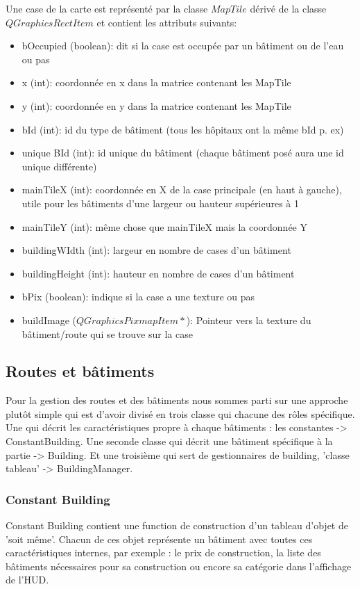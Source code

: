 \documentclass[a4paper,10pt,openany,oneside]{report}
\begin{document}
Une case de la carte est représenté par la classe $MapTile$ dérivé de la classe $QGraphicsRectItem$ et contient les attributs suivants:
\begin{itemize}
\item bOccupied (boolean): dit si la case est occupée par un bâtiment ou de l'eau ou pas
\item x (int): coordonnée en x dans la matrice contenant les MapTile
\item y (int): coordonnée en y dans la matrice contenant les MapTile
\item bId (int): id du type de bâtiment (tous les hôpitaux ont la même bId p. ex)
\item unique BId (int): id unique du bâtiment (chaque bâtiment posé aura une id unique différente)
\item mainTileX (int): coordonnée en X de la case principale (en haut à gauche), utile pour les bâtiments d'une largeur ou hauteur supérieures à 1
\item mainTileY (int): même chose que mainTileX mais la coordonnée Y
\item buildingWIdth (int): largeur en nombre de cases d'un bâtiment
\item buildingHeight (int): hauteur en nombre de cases d'un bâtiment
\item bPix (boolean): indique si la case a une texture ou pas
\item buildImage ($QGraphicsPixmapItem*$): Pointeur vers la texture du bâtiment/route qui se trouve sur la case
\end{itemize}
\subsection{Routes et bâtiments}
Pour la gestion des routes et des bâtiments nous sommes parti sur une approche plutôt simple qui est d'avoir divisé en trois classe qui chacune des rôles spécifique. Une qui décrit les caractéristiques propre à chaque bâtiments : les constantes -> ConstantBuilding. Une seconde classe qui décrit une bâtiment spécifique à la partie -> Building. Et une troisième qui sert de gestionnaires de building, 'classe tableau' -> BuildingManager. 

\subsubsection{Constant Building}
Constant Building contient une function de construction d'un tableau d'objet de 'soit même'. Chacun de ces objet représente un bâtiment avec toutes ces caractéristiques internes, par exemple : le prix de construction, la liste des bâtiments nécessaires pour sa construction ou encore sa catégorie dans l'affichage de l'HUD.
\end{document}
